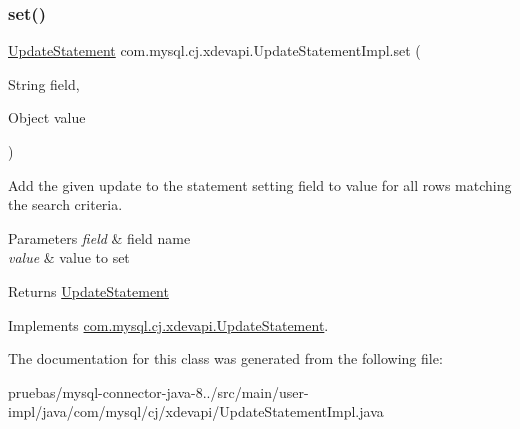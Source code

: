 \subsubsection{\texorpdfstring{set()}{set()}\hspace{0.1cm}{\footnotesize\ttfamily [2/2]}}
{\footnotesize\ttfamily \mbox{\hyperlink{interfacecom_1_1mysql_1_1cj_1_1xdevapi_1_1_update_statement}{Update\+Statement}} com.\+mysql.\+cj.\+xdevapi.\+Update\+Statement\+Impl.\+set (\begin{DoxyParamCaption}\item[{String}]{field,  }\item[{Object}]{value }\end{DoxyParamCaption})}

Add the given update to the statement setting field to value for all rows matching the search criteria.


\begin{DoxyParams}{Parameters}
{\em field} & field name \\
\hline
{\em value} & value to set \\
\hline
\end{DoxyParams}
\begin{DoxyReturn}{Returns}
\mbox{\hyperlink{interfacecom_1_1mysql_1_1cj_1_1xdevapi_1_1_update_statement}{Update\+Statement}} 
\end{DoxyReturn}


Implements \mbox{\hyperlink{interfacecom_1_1mysql_1_1cj_1_1xdevapi_1_1_update_statement_a01e50a32f4bf89c98b112b7e22a6f140}{com.\+mysql.\+cj.\+xdevapi.\+Update\+Statement}}.



The documentation for this class was generated from the following file\+:\begin{DoxyCompactItemize}
\item 
pruebas/mysql-\/connector-\/java-\/8../src/main/user-\/impl/java/com/mysql/cj/xdevapi/Update\+Statement\+Impl.\+java\end{DoxyCompactItemize}

